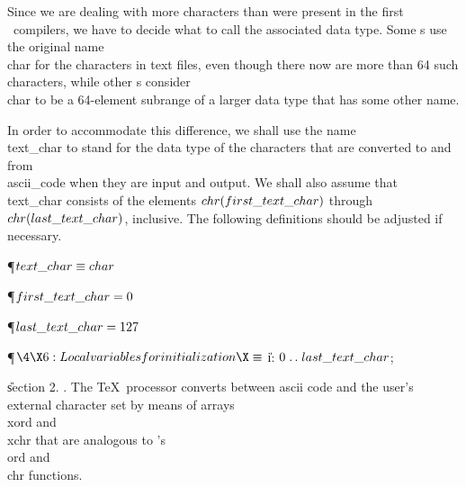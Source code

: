 Since we are dealing with more characters than were present in the first
\PASCAL\ compilers, we have to decide what to call the associated data
type. Some \PASCAL s use the original name \\{char} for the
characters in text files, even though there now are more than 64 such
characters, while other \PASCAL s consider \\{char} to be a 64-element
subrange of a larger data type that has some other name.

In order to accommodate this difference, we shall use the name \\{text\_char}
to stand for the data type of the characters that are converted to and
from \\{ascii\_code} when they are input and output. We shall also assume
that \\{text\_char} consists of the elements $\\{chr}(\\{first\_text\_char})$
through
$\\{chr}(\\{last\_text\_char})$, in\-clu\-sive. The following definitions
should be
adjusted if necessary.

\Y\P\D {}$\\{text\_char}\S\\{char}$\par
\P\D {}$\\{first\_text\_char}=0$\par
\P\D {}$\\{last\_text\_char}=127$\par
\Y\P$\4\X6:Local variables for initialization\X\S$\6
\4\|i: $0\to\\{last\_text\_char}$;\par
\U section 2.\fi
{}. The \TeX\ processor converts between ascii code and
the user's external character set by means of arrays \\{xord} and \\{xchr}
that are analogous to \PASCAL's \\{ord} and \\{chr} functions.

